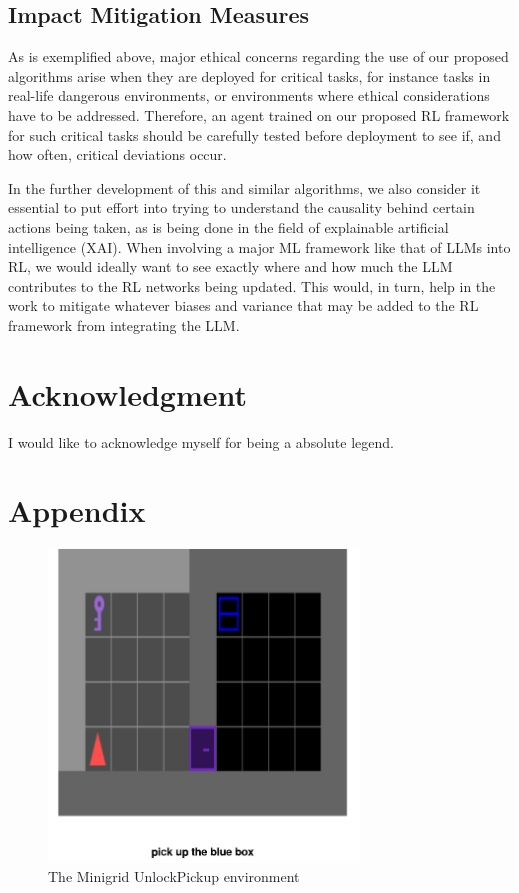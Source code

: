 \documentclass[conference]{IEEEtran}
\begin{document}
\subsection{Impact Mitigation Measures}

As is exemplified above, major ethical concerns regarding the use of our proposed algorithms arise when they are deployed for critical tasks, for instance tasks in real-life dangerous environments, or environments where ethical considerations have to be addressed. Therefore, an agent trained on our proposed RL framework for such critical tasks should be carefully tested before deployment to see if, and how often, critical deviations occur.

In the further development of this and similar algorithms, we also consider it essential to put effort into trying to understand the causality behind certain actions being taken, as is being done in the field of explainable artificial intelligence (XAI). When involving a major ML framework like that of LLMs into RL, we would ideally want to see exactly where and how much the LLM contributes to the RL networks being updated. This would, in turn, help in the work to mitigate whatever biases and variance that may be added to the RL framework from integrating the LLM.

\section*{Acknowledgment}

I would like to acknowledge myself for being a absolute legend.





\section*{Appendix}

\begin{figure}[h]
\centerline{\includegraphics[width=3.25in]{figure/unlockpickupenv.png}}
\caption{The Minigrid UnlockPickup environment}
\label{unlockpickupenv}
\end{figure}
\end{document}
